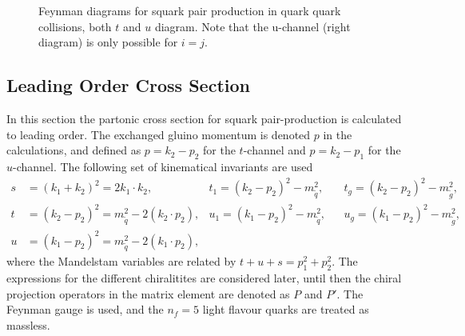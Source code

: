 \documentclass[twoside,english]{uiofysmaster}
\begin{document}
{\begin{figure}
\centering
{}
\caption{Feynman diagrams for squark pair production in quark quark collisions, both $t$ and $u$ diagram. Note that the u-channel (right diagram) is only possible for $i=j$.}
\label{Fig:: susy hadron : Feynman qq}
\end{figure}



\subsection{Leading Order Cross Section}

In this section the partonic cross section for squark pair-production is calculated to leading order. The exchanged gluino momentum is denoted $p$ in the calculations, and defined as $p= k_2-p_2 $ for the $t$-channel and $p=k_2-p_1$ for the $u$-channel. The following set of kinematical invariants are used
\begin{align*}
s &= (k_1 + k_2)^2 = 2 k_1 \cdot k_2, &t_1 = (k_2-p_2)^2 - m_{\widetilde{q}}^2, &&t_g = (k_2-p_2)^2 - m_{\widetilde{g}}^2,\\
t &= (k_2-p_2)^2 = m_{\widetilde{q}}^2 - 2 (k_2 \cdot p_2), &u_1 = (k_1-p_2)^2 - m_{\widetilde{q}}^2, &&u_g = (k_1-p_2)^2 - m_{\widetilde{g}}^2,\\
u &= (k_1 - p_2)^2 = m_{\widetilde{q}}^2 - 2 (k_1 \cdot p_2),
\end{align*}
where the Mandelstam variables are related by $t + u+ s = p_1^2 + p_2^2$. The expressions for the different chiralitites are considered later, until then the chiral projection operators in the matrix element are denoted as $P$ and $P'$. The Feynman gauge is used, and the $n_f = 5$ light flavour quarks are treated as massless. 

}
\end{document}
